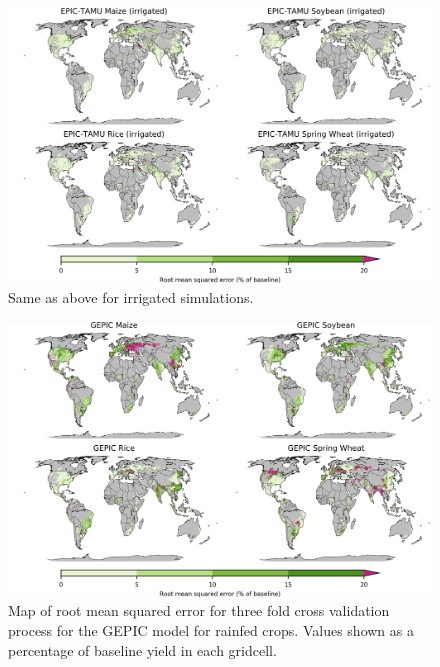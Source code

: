 \documentclass[10pt]{article}
\begin{document}
\begin{figure}[h!]
\centering
\includegraphics[width=15.5cm]{EPIC-TAMU_spatial_MSE_ton_ha_irr.png}
\caption{Same as above for irrigated simulations.}
\label{fig:pdssatrmseirr}
\end{figure}

\begin{figure}[h!]
\centering
\includegraphics[width=15.5cm]{GEPIC_spatial_MSE_ton_ha.png}
\caption{Map of root mean squared error for three fold cross validation process for the GEPIC model for rainfed crops. Values shown as a percentage of baseline yield in each gridcell.}
\label{fig:pdssatrmse}
\end{figure}
\end{document}
